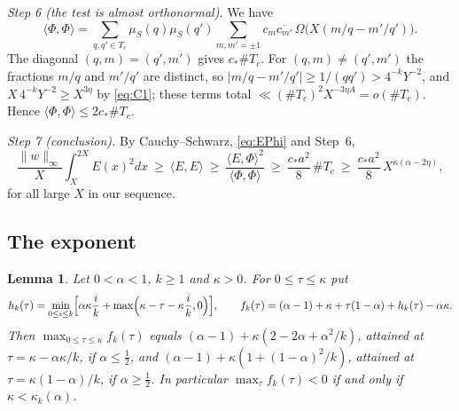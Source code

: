 \documentclass[11pt]{amsart}
\newtheorem{lemma}{Lemma}[section]
\theoremstyle{remark}
\numberwithin{equation}{section}
\begin{document}
\emph{Step 6 (the test is almost orthonormal).} We have
\[
\langle\Phi,\Phi\rangle=\sum_{q,q'\in T_c}\mu_S(q)\mu_S(q')\sum_{m,m'=\pm1}c_m\overline{c_{m'}}\,\Omega\bigl(X(m/q-m'/q')\bigr).
\]
The diagonal $(q,m)=(q',m')$ gives $c_*\#T_c$. For $(q,m)\ne(q',m')$ the fractions $m/q$ and $m'/q'$ are distinct, so $|m/q-m'/q'|\ge1/(qq')>4^{-k}Y^{-2}$, and $X\,4^{-k}Y^{-2}\ge X^{3\eta}$ by \eqref{eq:C1}; these terms total $\ll(\#T_c)^2X^{-3\eta A}=o(\#T_c)$. Hence $\langle\Phi,\Phi\rangle\le2c_*\#T_c$.

\emph{Step 7 (conclusion).} By Cauchy--Schwarz, \eqref{eq:EPhi} and Step~6,
\begin{equation}\label{eq:step7}
\frac{\|w\|_\infty}{X}\int_X^{2X}E(x)^2dx\ \ge\ \langle E,E\rangle\ \ge\ \frac{\langle E,\Phi\rangle^2}{\langle\Phi,\Phi\rangle}\ \ge\ \frac{c_*a^2}{8}\,\#T_c\ \ge\ \frac{c_*a^2}{8}\,X^{\kappa(\alpha-2\eta)} ,
\end{equation}
for all large $X$ in our sequence.

\subsection{The exponent}

\begin{lemma}\label{lem:exponent}
Let $0<\alpha<1$, $k\ge1$ and $\kappa>0$. For $0\le\tau\le\kappa$ put
\[
h_k(\tau)=\min_{0\le i\le k}\Bigl[\alpha\kappa\frac ik+\max\Bigl(\kappa-\tau-\kappa\frac ik,0\Bigr)\Bigr],\qquad f_k(\tau)=(\alpha-1)+\kappa+\tau(1-\alpha)+h_k(\tau)-\alpha\kappa .
\]
Then $\max_{0\le\tau\le\kappa}f_k(\tau)$ equals $(\alpha-1)+\kappa(2-2\alpha+\alpha^2/k)$, attained at $\tau=\kappa-\alpha\kappa/k$, if $\alpha\le\tfrac12$, and $(\alpha-1)+\kappa(1+(1-\alpha)^2/k)$, attained at $\tau=\kappa(1-\alpha)/k$, if $\alpha\ge\tfrac12$. In particular $\max_\tau f_k(\tau)<0$ if and only if $\kappa<\kappa_k(\alpha)$.
\end{lemma}
\end{document}
